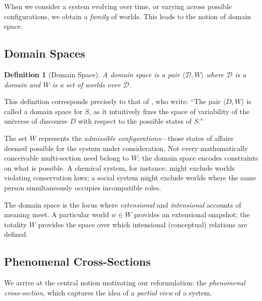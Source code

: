 \documentclass[12pt,a4paper]{article}
\newtheorem{definition}{Definition}[section]
\newcommand{\domain}{\mathcal{D}}
\begin{document}
When we consider a system evolving over time, or varying across possible configurations, we obtain a \emph{family} of worlds. This leads to the notion of domain space.

\subsection{Domain Spaces}

\begin{definition}[Domain Space]
\label{def:domain-space}
A \emph{domain space} is a pair $\langle \domain, W \rangle$ where $\domain$ is a domain and $W$ is a set of worlds over $\domain$.
\end{definition}

This definition corresponds precisely to that of \citet{guarino2009}, who write: ``The pair $\langle D, W \rangle$ is called a domain space for $S$, as it intuitively fixes the space of variability of the universe of discourse $D$ with respect to the possible states of $S$."

The set $W$ represents the \emph{admissible configurations}---those states of affairs deemed possible for the system under consideration. Not every mathematically conceivable multi-section need belong to $W$; the domain space encodes constraints on what is possible. A chemical system, for instance, might exclude worlds violating conservation laws; a social system might exclude worlds where the same person simultaneously occupies incompatible roles.

The domain space is the locus where \emph{extensional} and \emph{intensional} accounts of meaning meet. A particular world $w \in W$ provides an extensional snapshot; the totality $W$ provides the space over which intensional (conceptual) relations are defined.

\subsection{Phenomenal Cross-Sections}

We arrive at the central notion motivating our reformulation: the \emph{phenomenal cross-section}, which captures the idea of a \emph{partial view} of a system.
\end{document}
